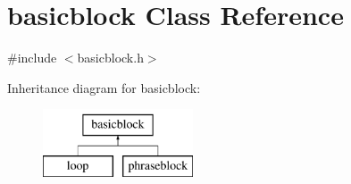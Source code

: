 \hypertarget{classbasicblock}{
\section{basicblock Class Reference}
\label{classbasicblock}
}


{\ttfamily \#include $<$basicblock.h$>$}

Inheritance diagram for basicblock:\begin{figure}[H]
\begin{center}
\leavevmode
\includegraphics[height=2.000000cm]{classbasicblock}
\end{center}
\end{figure}
